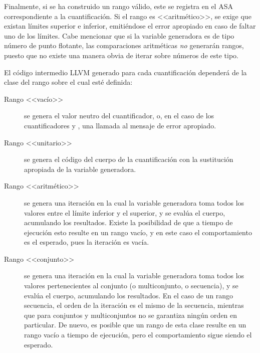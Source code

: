 {{Finalmente, si se ha construido un rango válido, este se registra en el ASA
correspondiente a la cuantificación. Si el rango es <<aritmético>>, se exige que
existan límites superior e inferior, emitiéndose el error apropiado en caso de
faltar uno de los límites. Cabe mencionar que si la variable generadora es de
tipo número de punto flotante, las comparaciones aritméticas \emph{no} generarán
rangos, puesto que no existe una manera obvia de iterar sobre números de este
tipo.

El código intermedio LLVM generado para cada cuantificación dependerá de la
clase del rango sobre el cual esté definida:

\begin{description}

  \item [Rango <<vacío>>] se genera el valor neutro del cuantificador, o, en el
caso de los cuantificadores  y , una llamada al mensaje
de error apropiado.

  \item [Rango <<unitario>>] se genera el código del cuerpo de la cuantificación
con la sustitución apropiada de la variable generadora.

  \item [Rango <<aritmético>>] se genera una iteración en la cual la variable
generadora toma todos los valores entre el límite inferior y el superior, y se
evalúa el cuerpo, acumulando los resultados. Existe la posibilidad de que a
tiempo de ejecución esto resulte en un rango vacío, y en este caso el
comportamiento es el esperado, pues la iteración es vacía.

  \item [Rango <<conjunto>>] se genera una iteración en la cual la variable
generadora toma todos los valores pertenecientes al conjunto (o multiconjunto,
o secuencia), y se evalúa el cuerpo, acumulando los resultados. En el caso de un
rango secuencia, el orden de la iteración es el mismo de la secuencia, mientras
que para conjuntos y multiconjuntos no se garantiza ningún orden en particular.
De nuevo, es posible que un rango de esta clase resulte en un rango vacío a
tiempo de ejecución, pero el comportamiento sigue siendo el esperado.

\end{description}


}}
